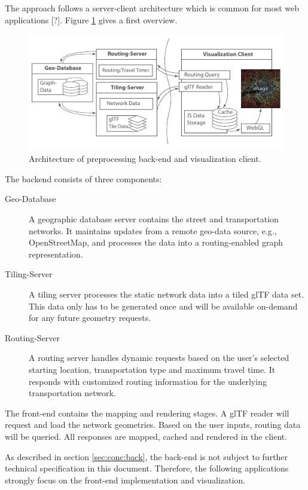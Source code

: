    The approach follows a server-client architecture which is common for most web applications [?]. Figure \ref{fig:poc:arch} gives a first overview.\par
    \begin{figure}[h]
      \centering
      \includegraphics[width=\linewidth]{./img/conceptual-overview-bw.pdf}
      \caption{Architecture of preprocessing back-end and visualization client.}
      \label{fig:poc:arch}
    \end{figure}
    The backend consists of three components:
    \begin{description}
      \item[Geo-Database] A geographic database server contains the street and transportation networks. It maintains updates from a remote geo-data source, e.g., OpenStreetMap, and processes the data into a routing-enabled graph representation.
      \item[Tiling-Server] A tiling server processes the static network data into a tiled glTF data set. This data only has to be generated once and will be available on-demand for any future geometry requests.
      \item[Routing-Server] A routing server handles dynamic requests based on the user's selected starting location, transportation type and maximum travel time. It responds with customized routing information for the underlying transportation network.
    \end{description}
    The front-end contains the mapping and rendering stages. A glTF reader will request and load the network geometries. Based on the user inputs, routing data will be queried. All responses are mapped, cached and rendered in the client.\par
    As described in section \ref{sec:conc:back}, the back-end is not subject to further technical specification in this document. Therefore, the following applications strongly focus on the front-end implementation and visualization.\par
